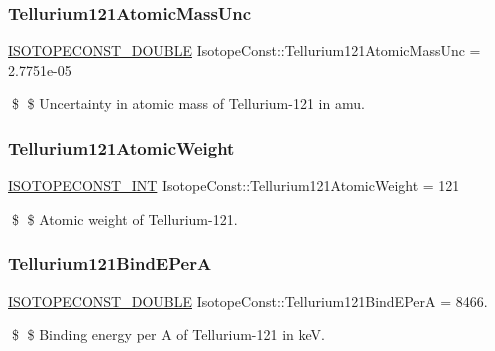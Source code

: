 \subsubsection{\texorpdfstring{Tellurium121\+Atomic\+Mass\+Unc}{Tellurium121AtomicMassUnc}}
{\footnotesize\ttfamily \mbox{\hyperlink{group___isotope_const-_macros_ga8f45a7272ce02c0b4c65c44636ed719a}{I\+S\+O\+T\+O\+P\+E\+C\+O\+N\+S\+T\+\_\+\+D\+O\+U\+B\+LE}} Isotope\+Const\+::\+Tellurium121\+Atomic\+Mass\+Unc = 2.\+7751e-\/05}

\$ \$ Uncertainty in atomic mass of Tellurium-\/121 in amu. \mbox{\label{group___isotope_const-_tellurium-_te121_gac55bd6727f4e2d2c7fa54372b7866b83}} 
\subsubsection{\texorpdfstring{Tellurium121\+Atomic\+Weight}{Tellurium121AtomicWeight}}
{\footnotesize\ttfamily \mbox{\hyperlink{group___isotope_const-_macros_ga5f18360b3e99483a35c32d789e62621c}{I\+S\+O\+T\+O\+P\+E\+C\+O\+N\+S\+T\+\_\+\+I\+NT}} Isotope\+Const\+::\+Tellurium121\+Atomic\+Weight = 121}

\$ \$ Atomic weight of Tellurium-\/121. \mbox{\label{group___isotope_const-_tellurium-_te121_ga5b3c3e6316a764ef831275e05c91d512}} 
\subsubsection{\texorpdfstring{Tellurium121\+Bind\+E\+PerA}{Tellurium121BindEPerA}}
{\footnotesize\ttfamily \mbox{\hyperlink{group___isotope_const-_macros_ga8f45a7272ce02c0b4c65c44636ed719a}{I\+S\+O\+T\+O\+P\+E\+C\+O\+N\+S\+T\+\_\+\+D\+O\+U\+B\+LE}} Isotope\+Const\+::\+Tellurium121\+Bind\+E\+PerA = 8466.}

\$ \$ Binding energy per A of Tellurium-\/121 in keV. \mbox{\label{group___isotope_const-_tellurium-_te121_ga1c66de3b54d9fe15a1110406fb190b0d}} 
